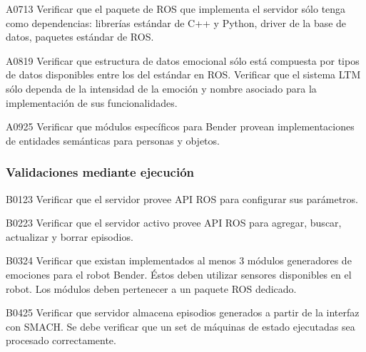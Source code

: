 \begin{def-validacion}{A}{07}{13}
Verificar que el paquete de ROS que implementa el servidor sólo tenga como dependencias: librerías estándar de C++ y Python, driver de la base de datos, paquetes estándar de ROS.	
\end{def-validacion}

\begin{def-validacion}{A}{08}{19}
Verificar que estructura de datos emocional sólo está compuesta por tipos de datos disponibles entre los del estándar en ROS. Verificar que el sistema LTM sólo dependa de la intensidad de la emoción y nombre asociado para la implementación de sus funcionalidades.	
\end{def-validacion}

\begin{def-validacion}{A}{09}{25}
	Verificar que módulos específicos para Bender provean implementaciones de entidades semánticas para personas y objetos.
\end{def-validacion}




\subsubsection{Validaciones mediante ejecución}

\begin{def-validacion}{B}{01}{23}
	Verificar que el servidor provee API ROS para configurar sus parámetros.	
\end{def-validacion}

\begin{def-validacion}{B}{02}{23}
	Verificar que el servidor activo provee API ROS para agregar, buscar, actualizar y borrar episodios. 	
\end{def-validacion}

\begin{def-validacion}{B}{03}{24}
	Verificar que existan implementados al menos 3 módulos generadores de emociones para el robot Bender. Éstos deben utilizar sensores disponibles en el robot. Los módulos deben pertenecer a un paquete ROS dedicado.	
\end{def-validacion}

\begin{def-validacion}{B}{04}{25}
	Verificar que servidor almacena episodios generados a partir de la interfaz con SMACH. Se debe verificar que un set de máquinas de estado ejecutadas sea procesado correctamente.	
\end{def-validacion}

